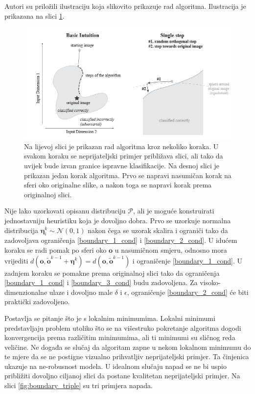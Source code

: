 \documentclass[utf8, diplomski]{fer}
\begin{document}
Autori su priložili ilustraciju koja slikovito prikazuje rad algoritma. Ilustracija je prikazana na slici \ref{fig:boundary_intuition}.


\begin{figure}[H]
\centering
\includegraphics[width=1.0\textwidth,keepaspectratio]{img/other/boundary_intuition.png}
\caption{Na lijevoj slici je prikazan rad algoritma kroz nekoliko koraka. U svakom koraku se neprijateljski primjer približava slici, ali tako da uvijek bude izvan granice ispravne klasifikacije. Na desnoj slici je prikazan jedan korak algoritma. Prvo se napravi nasumičan korak na sferi oko originalne slike, a nakon toga se napravi korak prema originalnoj slici.}
\label{fig:boundary_intuition}
\end{figure}

Nije lako uzorkovati opisanu distribuciju $\mathcal{P}$, ali je moguće konstruirati jednostavniju heuristiku koja je dovoljno dobra. Prvo se uzorkuje normalna distribucija $\boldsymbol{\eta}_{i}^{k} \sim \mathcal{N}(0, 1)$ nakon čega se uzorak skalira i ograniči tako da zadovoljava ograničenja \ref{boundary_1_cond} i \ref{boundary_2_cond}. U idućem koraku se radi pomak po sferi oko $\boldsymbol{o}$ u nasumičnom smjeru, odnosno mora vrijediti $d(\boldsymbol{o}, \boldsymbol{\tilde{o}}^{k-1} + \boldsymbol{\eta}^{k}) = d(\boldsymbol{o}, \boldsymbol{\tilde{o}}^{k-1})$ i ograničenje \ref{boundary_1_cond}. U zadnjem koraku se pomakne prema originalnoj slici tako da ograničenja \ref{boundary_1_cond} i \ref{boundary_3_cond} budu zadovoljena. Za visoko-dimenzionalne ulaze i dovoljno male $\delta$ i $\epsilon$, ograničenje \ref{boundary_2_cond} će biti praktički zadovoljeno. \par
Postavlja se pitanje što je s lokalnim minimumima. Lokalni minimumi predstavljaju problem utoliko što se na višestruko pokretanje algoritma dogodi konvergencija prema različitim minimumima, ali ti minimumi su sličnog reda veličine. Ne događa se slučaj da algoritam zapne u nekom lokalnom minimumu do te mjere da se ne postigne vizualno prihvatljiv neprijateljski primjer. Ta činjenica ukazuje na ne-robusnost modela. U idealnom slučaju napad se ne bi uspio približiti dovoljno ciljanoj slici da postane kvalitetan neprijateljski primjer. Na slici \ref{fig:boundary_triple} su tri primjera napada. \par
\end{document}
